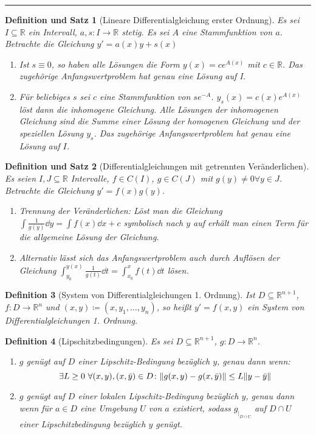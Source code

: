 \documentclass[a4paper]{article}
\newcounter{Sec}
\theoremstyle{marginbreak}
\newtheorem{definition}{Definition}[Sec]
\newtheorem{defsatz}[definition]{Definition und Satz}
\newcommand{\sep}{%
	\rule{\textwidth}{0.3pt}%
	\stepcounter{Sec}%
	}
\begin{document}
	\sep
	\begin{defsatz}[Lineare Differentialgleichung erster Ordnung]
		Es sei $I\subseteq\mathbb{R}$ ein Intervall, $a, s\colon I\to\mathbb{R}$ stetig.
		Es sei $A$ eine Stammfunktion von $a$. Betrachte die Gleichung $y' = a(x)y + s(x)$
		\begin{enumerate}[label=(\alph*)]
			\item Ist $s\equiv 0$, so haben alle Lösungen die Form $y(x) = ce^{A(x)}$ mit $c\in\mathbb{R}$.
				Das zugehörige Anfangswertproblem hat genau eine Lösung auf I.
			\item Für beliebiges $s$ sei $c$ eine Stammfunktion von $se^{-A}$.
				$y_s(x) = c(x)e^{A(x)}$ löst dann die inhomogene Gleichung. Alle
				Lösungen der inhomogenen Gleichung sind die Summe einer Lösung der homogenen
				Gleichung und der speziellen Lösung $y_s$. Das zugehörige Anfangswertproblem
				hat genau eine Lösung auf $I$.
		\end{enumerate}
	\end{defsatz}
	\begin{defsatz}[Differentialgleichungen mit getrennten Veränderlichen]
		Es seien $I, J\subseteq\mathbb{R}$ Intervalle, $f\in C(I)$, $g\in C(J)$ mit $g(y)\neq 0\forall y\in J$.
		Betrachte die Gleichung $y' = f(x)g(y)$.
		\begin{enumerate}[label=(\alph*)]
			\item Trennung der Veränderlichen: Löst man die Gleichung
				$\int \frac{1}{g(y)}\dd{y} = \int f(x)\dd{x}+c$ symbolisch nach $y$ auf erhält man einen Term für
				die allgemeine Lösung der Gleichung.
			\item Alternativ lässt sich das Anfangswertproblem auch durch Auflösen der Gleichung
				$\int_{y_0}^{y(x)}\frac{1}{g(t)}\dd{t} = \int_{x_0}^x f(t)\dd{t}$ lösen.
		\end{enumerate}
	\end{defsatz}
	\begin{definition}[System von Differentialgleichungen 1. Ordnung]
		Ist $D\subseteq\mathbb{R}^{n+1}$, $f\colon D\to\mathbb{R}^n$ und
		$(x, y)\coloneqq (x, y_1, \ldots, y_n)$, so heißt $y' = f(x, y)$ ein System
		von Differentialgleichungen 1. Ordnung.
	\end{definition}
	\begin{definition}[Lipschitzbedingungen]
		Es sei $D\subseteq\mathbb{R}^{n+1}$, $g\colon D\to\mathbb{R}^n$.
		\begin{enumerate}[label=(\alph*)]
			\item $g$ genügt auf $D$ einer Lipschitz-Bedingung bezüglich $y$,
				genau dann wenn:
				\[
					\exists L\geq 0\ \forall (x, y), (x, \bar{y})\in D
					\colon \norm{g(x, y) - g(x, \bar{y})} \leq L\norm{y - \bar{y}}
				\]
			\item $g$ genügt auf $D$ einer lokalen Lipschitz-Bedingung bezüglich $y$, genau
				dann wenn für $a\in D$ eine Umgebung $U$ von $a$ existiert, sodass $g_{\vert_{D\cap U}}$
				auf $D\cap U$ einer Lipschitzbedingung bezüglich $y$ genügt.
		\end{enumerate}
	\end{definition}
\end{document}
